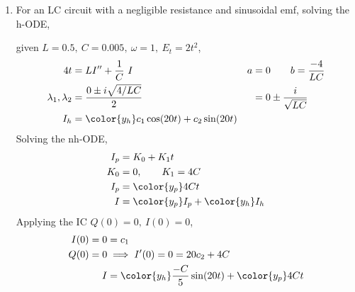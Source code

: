 \begin{enumerate}
    \item For an LC circuit with a negligible resistance and sinusoidal emf, solving the h-ODE, \par
          given $ L = 0.5,\ C = 0.005,\ \omega = 1,\ E_{t} = 2t^{2}$,
          \begin{align}
              4t                       & = LI'' + \frac{1}{C}\ I                          & a & = 0 \qquad b = \frac{-4}{LC} \\
              \lambda_{1}, \lambda_{2} & = \frac{0 \pm i\sqrt{4/LC}}{2}                   &   & = 0 \pm \frac{i}{\sqrt{LC}}  \\
              I_{h}                    & = {\color{y_h} c_{1}\cos(20 t)+ c_{2}\sin(20 t)}
          \end{align}
          Solving the nh-ODE,
          \begin{align}
              I_{p} & = K_{0} + K_{1}t                          \\
              K_{0} & = 0, \qquad K_{1} = 4C                    \\
              I_{p} & = {\color{y_p} 4Ct}                       \\
              I     & ={\color{y_p} I_{p}} + {\color{y_h}I_{h}}
          \end{align}
          Applying the IC $ Q(0) = 0,\ I(0) = 0 $,
          \begin{align}
              I(0) = 0 & = c_{1}                                                   \\
              Q(0) = 0 & \implies I'(0) = 0 = 20c_{2} + 4C                         \\
              I        & = {\color{y_h} \frac{-C}{5}\sin(20t)} + {\color{y_p} 4Ct}
          \end{align}
          \begin{figure}[H]
              \centering
          \end{figure}


\end{enumerate}
